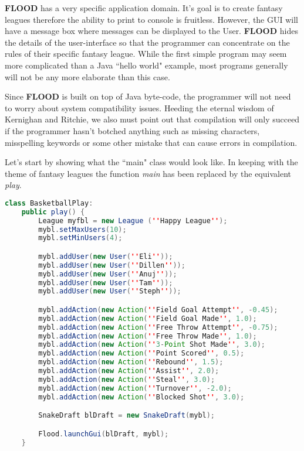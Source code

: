\documentclass[12pt]{report}
\begin{document}
\begin{doublespace}
\textbf{FLOOD} has a very specific application domain. It's goal is to create fantasy leagues therefore the ability to print to console is fruitless. However, the GUI will have a message box where messages can be displayed to the User. \textbf{FLOOD} hides the details of the user-interface so that the programmer can concentrate on the rules of their specific fantasy league. While the first simple program may seem more complicated than a Java ``hello world" example, most programs generally will not be any more elaborate than this case.

Since \textbf{FLOOD} is built on top of Java byte-code, the programmer will not need to worry about system compatibility issues. Heeding the eternal wisdom of Kernighan and Ritchie, we also must point out that compilation will only succeed if the programmer hasn't botched anything such as missing characters, misspelling keywords or some other mistake that can cause errors in compilation. 

Let's start by showing what the ``main" class would look like. In keeping with the theme of fantasy leagues the function \textit{main} has been replaced by the equivalent \textit{play}. 
\end{doublespace}

\begin{lstlisting}[language=Java,label=some-code,caption=BasketballPlay.fld]
class BasketballPlay:
	public play() {
		League myfbl = new League (''Happy League'');
		mybl.setMaxUsers(10);
		mybl.setMinUsers(4);

		mybl.addUser(new User(''Eli''));
		mybl.addUser(new User(''Dillen''));
		mybl.addUser(new User(''Anuj''));
		mybl.addUser(new User(''Tam''));
		mybl.addUser(new User(''Steph''));

		mybl.addAction(new Action(''Field Goal Attempt'', -0.45);
		mybl.addAction(new Action(''Field Goal Made'', 1.0);
		mybl.addAction(new Action(''Free Throw Attempt'', -0.75);
		mybl.addAction(new Action(''Free Throw Made'', 1.0);
		mybl.addAction(new Action(''3-Point Shot Made'', 3.0);
		mybl.addAction(new Action(''Point Scored'', 0.5);
		mybl.addAction(new Action(''Rebound'', 1.5);
		mybl.addAction(new Action(''Assist'', 2.0);
		mybl.addAction(new Action(''Steal'', 3.0);
		mybl.addAction(new Action(''Turnover'', -2.0);
		mybl.addAction(new Action(''Blocked Shot'', 3.0);

		SnakeDraft blDraft = new SnakeDraft(mybl);

		Flood.launchGui(blDraft, mybl);
	}
\end{lstlisting}
\end{document}

